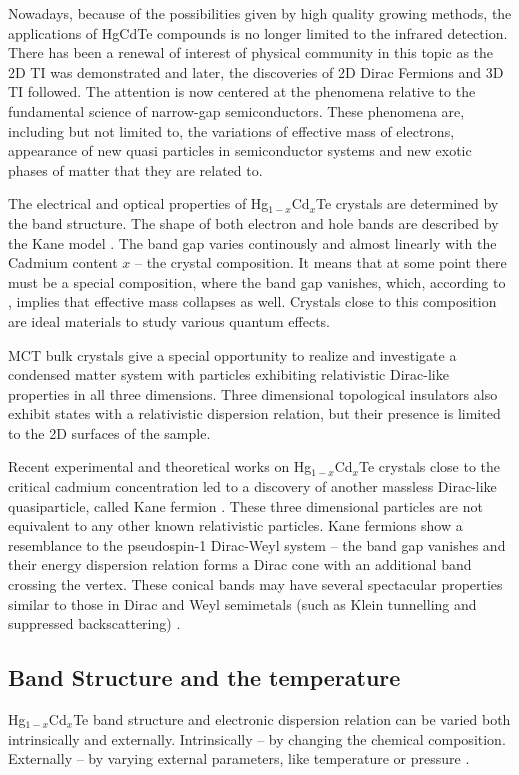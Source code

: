 \documentclass[titlepage,a4paper]{book}
\newcommand{\wciecie}{\quad\phantom{v}}
\begin{document}
Nowadays, because of the possibilities given by high quality growing methods, the applications of HgCdTe compounds is no longer limited to the infrared detection. There has been a renewal of interest of physical community in this topic as the 2D TI was demonstrated and later, the discoveries of 2D Dirac Fermions and 3D TI followed. The attention is now centered at the phenomena relative to the fundamental science of narrow-gap semiconductors. These phenomena are, including but not limited to, the variations of effective mass of electrons, appearance of new quasi particles in semiconductor systems and new exotic phases of matter that they are related to. 

The electrical and optical properties of Hg$_{1-x}$Cd$_x$Te crystals are determined by the band structure. The shape of both electron and hole bands are described by the Kane model \cite{Kane_Model}. The band gap varies continously and almost linearly with the Cadmium content $x$ -- the crystal composition. It means that at some point there must be a special composition, where the band gap vanishes, which, according to \cite{Zawadzki_Topology}, implies that effective mass collapses as well. Crystals close to this composition are ideal materials to study various quantum  effects.

MCT bulk crystals give a special opportunity to realize and investigate a condensed matter system with particles exhibiting relativistic Dirac-like properties in all three dimensions. Three dimensional topological insulators also exhibit states with a relativistic dispersion relation, but their presence is limited to the 2D surfaces of the sample.

Recent experimental \cite{Orlita_MCT} and theoretical \cite{Malcolm_MCT} works on Hg$_{1-x}$Cd$_x$Te crystals close to the critical cadmium concentration led to a discovery of another massless Dirac-like quasiparticle, called Kane fermion \cite{Orlita_MCT}. These three dimensional particles are not equivalent to any other known relativistic particles. Kane fermions show a resemblance to the pseudospin-1 Dirac-Weyl system \cite{Malcolm_MCT} -- the band gap vanishes \cite{Weiler_MCT} and their energy dispersion relation forms a Dirac cone with an additional band crossing the vertex. These conical bands may have several spectacular properties similar to those in Dirac and Weyl semimetals (such as Klein tunnelling and suppressed backscattering) \cite{Orlita_MCT}. 

\subsection{Band Structure and the temperature}
\wciecie
Hg$_{1-x}$Cd$_x$Te band structure and electronic dispersion relation can be varied both intrinsically and externally. Intrinsically -- by changing the chemical composition. Externally -- by varying external parameters, like temperature \cite{Capper_MCT} or pressure \cite{Krishtopenko_pressure}. 
\end{document}
